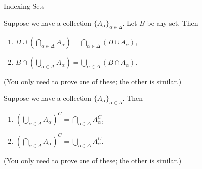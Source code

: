 \begin{section}{Indexing Sets}
\begin{theorem}
Suppose we have a collection $\{A_{\alpha}\}_{\alpha\in\Delta}$.  Let $B$ be any set.  Then
\begin{enumerate}
\item $\displaystyle B \cup \left(\bigcap_{\alpha\in\Delta}A_{\alpha}\right)=\bigcap_{\alpha\in\Delta}(B\cup A_{\alpha})$,
\item $\displaystyle B \cap \left(\bigcup_{\alpha\in\Delta}A_{\alpha}\right)=\bigcup_{\alpha\in\Delta}(B\cap A_{\alpha})$.
\end{enumerate}
(You only need to prove one of these; the other is similar.)
\end{theorem}

\begin{theorem}
Suppose we have a collection $\{A_{\alpha}\}_{\alpha\in\Delta}$.  Then
\begin{enumerate}
\item $\displaystyle \left(\bigcup_{\alpha\in\Delta} A_{\alpha}\right)^C=\bigcap_{\alpha\in\Delta}A_{\alpha}^{C}$,
\item $\displaystyle \left(\bigcap_{\alpha\in\Delta} A_{\alpha}\right)^C=\bigcup_{\alpha\in\Delta}A_{\alpha}^{C}$.
\end{enumerate}
(You only need to prove one of these; the other is similar.)
\end{theorem}

\end{section}
